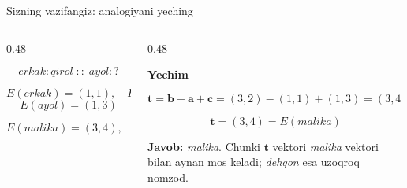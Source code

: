 \documentclass[aspectratio=169,11pt]{beamer}
\begin{document}
\begin{frame}{Sizning vazifangiz: analogiyani yeching}
\small

\begin{columns}[T,totalwidth=\textwidth]
\begin{column}{0.48\textwidth}

\begin{tcolorbox}[alertbox,title=Vazifa]
\[
\textit{erkak}:\textit{qirol}
\;::\;
\textit{ayol}:?
\]

\[
E(\textit{erkak})=(1,1),\quad
E(\textit{qirol})=(3,2)
\]
\[
E(\textit{ayol})=(1,3)
\]

\[
E(\textit{malika})=(3,4),\quad
E(\textit{dehqon})=(2,1)
\]
\end{tcolorbox}

\end{column}

\begin{column}{0.48\textwidth}

\textbf{Yechim}

\[
\mathbf{t}
=
\mathbf{b}-\mathbf{a}+\mathbf{c}
=
(3,2)-(1,1)+(1,3)
=
(3,4)
\]

\vspace{3pt}

\[
\mathbf{t}=(3,4)=E(\textit{malika})
\]

\vspace{3pt}

\begin{tcolorbox}[defbox]
\footnotesize
\textbf{Javob:} \textit{malika}.  
Chunki \(\mathbf{t}\) vektori \textit{malika} vektori bilan aynan mos keladi;
\textit{dehqon} esa uzoqroq nomzod.
\end{tcolorbox}

\end{column}
\end{columns}

\end{frame}
\end{document}
